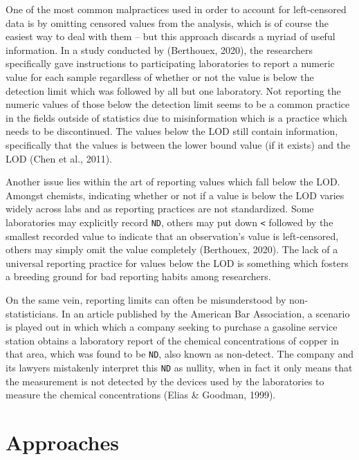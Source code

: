 \documentclass[12pt, twoside]{amherstthesis}
\begin{document}
One of the most common malpractices used in order to account for left-censored data is by omitting censored values from the analysis, which is of course the easiest way to deal with them -- but this approach discards a myriad of useful information. In a study conducted by (Berthouex, 2020), the researchers specifically gave instructions to participating laboratories to report a numeric value for each sample regardless of whether or not the value is below the detection limit which was followed by all but one laboratory. Not reporting the numeric values of those below the detection limit seems to be a common practice in the fields outside of statistics due to misinformation which is a practice which needs to be discontinued. The values below the LOD still contain information, specifically that the values is between the lower bound value (if it exists) and the LOD (Chen et al., 2011).

Another issue lies within the art of reporting values which fall below the LOD. Amongst chemists, indicating whether or not if a value is below the LOD varies widely across labs and as reporting practices are not standardized. Some laboratories may explicitly record \texttt{ND}, others may put down \texttt{\textless{}} followed by the smallest recorded value to indicate that an observation's value is left-censored, others may simply omit the value completely (Berthouex, 2020). The lack of a universal reporting practice for values below the LOD is something which fosters a breeding ground for bad reporting habits among researchers.

On the same vein, reporting limits can often be misunderstood by non-statisticians. In an article published by the American Bar Association, a scenario is played out in which which a company seeking to purchase a gasoline service station obtains a laboratory report of the chemical concentrations of copper in that area, which was found to be \texttt{ND}, also known as non-detect. The company and its lawyers mistakenly interpret this \texttt{ND} as nullity, when in fact it only means that the measurement is not detected by the devices used by the laboratories to measure the chemical concentrations (Elias \& Goodman, 1999).

\hypertarget{Approaches}{%
\section{Approaches}\label{Approaches}}
\end{document}
